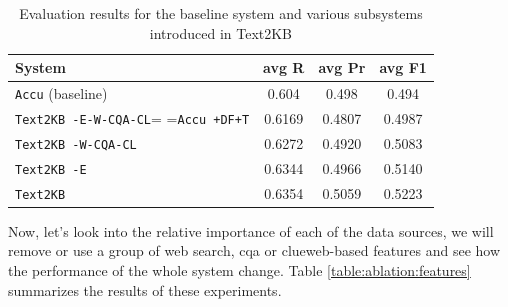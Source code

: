 \begin{table}
\caption{Evaluation results for the baseline system and various subsystems introduced in Text2KB}
\label{table:ablation:entities_vs_features}
\begin{tabular}{| p{4.2cm} | c | c | c | }
\hline
System & avg R & avg Pr &  avg F1 \\
\hline
\texttt{Accu} (baseline) & 0.604 & 0.498 & 0.494\\
\texttt{Text2KB -E-W-CQA-CL}= =\texttt{Accu +DF+T} & 0.6169 & 0.4807 & 0.4987 \\
\texttt{Text2KB -W-CQA-CL} & 0.6272 & 0.4920 & 0.5083 \\  %
\texttt{Text2KB -E} & 0.6344 & 0.4966 & 0.5140 \\  %
\hline
\texttt{Text2KB} & 0.6354 & 0.5059 & 0.5223 \\
\hline
\end{tabular}
\end{table}

Now, let's look into the relative importance of each of the data sources, we will remove or use a group of web search, cqa or clueweb-based features and see how the performance of the whole system change.
Table \ref{table:ablation:features} summarizes the results of these experiments.


